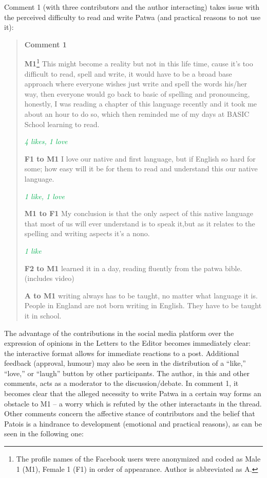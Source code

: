 \documentclass[output=paper,colorlinks,citecolor=brown]{langscibook}
\begin{document}
Comment 1 (with three contributors and the author interacting) takes issue with the perceived difficulty to read and write Patwa (and practical reasons to not use it):

\begin{quote} \noindent
\textbf{Comment 1} \noindent

\textbf{M1}\footnote[4]{The profile names of the Facebook users were anonymized and coded as Male 1 (M1), Female 1 (F1) in order of appearance. Author is abbreviated as A.} This might become a reality but not in this life time, cause it’s too difficult to read, spell and write, it would have to be a broad base approach where everyone wishes just write and spell the words his/her way, then everyone would go back to basic of spelling and pronouncing, honestly, I was reading a chapter of this language recently and it took me about an hour to do so, which then reminded me of my days at BASIC School learning to read.

\textit{\textcolor[HTML]{00B050}{4 likes, 1 love}}

\textbf{F1 to M1} I love our native and first language, but if English so hard for some; how easy will it be for them to read and understand this our native language.

\textit{\textcolor[HTML]{00B050}{1 like, 1 love}}

\textbf{M1 to F1} My conclusion is that the only aspect of this native language that most of us will ever understand is to speak it,but as it relates to the spelling and writing aspects it’s a nono.

\textit{\textcolor[HTML]{00B050}{1 like}}

\textbf{F2 to M1} learned it in a day, reading fluently from the patwa bible. (includes video)

\textbf{A to M1} writing always has to be taught, no matter what language it is. People in England are not born writing in English. They have to be taught it in school.
\end{quote}

The advantage of the contributions in the social media platform over the expression of opinions in the Letters to the Editor becomes immediately clear: the interactive format allows for immediate reactions to a post. Additional feedback (approval, humour) may also be seen in the distribution of a “like,” “love,” or “laugh” button by other participants. The author, in this and other comments, acts as a moderator to the discussion/debate. In comment 1, it becomes clear that the alleged necessity to write Patwa in a certain way forms an obstacle to M1 -- a worry which is refuted by the other interactants in the thread.
Other comments concern the affective stance of contributors and the belief that Patois is a hindrance to development (emotional and practical reasons), as can be seen in the following one:
\end{document}

